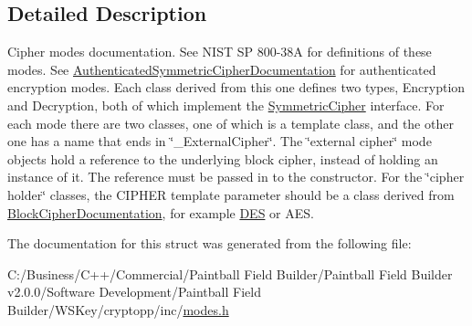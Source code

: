 \subsection{Detailed Description}
Cipher modes documentation. See NIST SP 800-\/38A for definitions of these modes. See \hyperlink{struct_authenticated_symmetric_cipher_documentation}{AuthenticatedSymmetricCipherDocumentation} for authenticated encryption modes. Each class derived from this one defines two types, Encryption and Decryption, both of which implement the \hyperlink{class_symmetric_cipher}{SymmetricCipher} interface. For each mode there are two classes, one of which is a template class, and the other one has a name that ends in \char`\"{}\_\-ExternalCipher\char`\"{}. The \char`\"{}external cipher\char`\"{} mode objects hold a reference to the underlying block cipher, instead of holding an instance of it. The reference must be passed in to the constructor. For the \char`\"{}cipher holder\char`\"{} classes, the CIPHER template parameter should be a class derived from \hyperlink{struct_block_cipher_documentation}{BlockCipherDocumentation}, for example \hyperlink{class_d_e_s}{DES} or AES. 

The documentation for this struct was generated from the following file:\begin{DoxyCompactItemize}
\item 
C:/Business/C++/Commercial/Paintball Field Builder/Paintball Field Builder v2.0.0/Software Development/Paintball Field Builder/WSKey/cryptopp/inc/\hyperlink{modes_8h}{modes.h}\end{DoxyCompactItemize}
